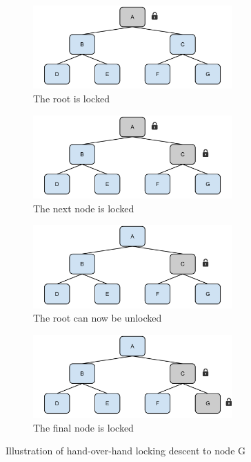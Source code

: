 \documentclass[11pt,a4paper]{globis-book}
\begin{document}
\begin{figure}[t]
    \centering
    \begin{subfigure}[b]{0.5\linewidth}
        \includegraphics[width = 3in]{images/Tree-HoH-a}
        \caption{The root is locked}
    \end{subfigure}%
    \begin{subfigure}[b]{0.5\linewidth}
        \includegraphics[width = 3in]{images/Tree-HoH-b}
        \caption{The next node is locked}
    \end{subfigure}
    \begin{subfigure}[b]{0.5\linewidth}
        \includegraphics[width = 3in]{images/Tree-HoH-c}
        \caption{The root can now be unlocked}
    \end{subfigure}%
    \begin{subfigure}[b]{0.5\linewidth}
        \includegraphics[width = 3in]{images/Tree-HoH-d}
        \caption{The final node is locked}
    \end{subfigure}
    \caption{Illustration of hand-over-hand locking descent to node G}
    \label{fig:locking-hoh}
\end{figure}
\end{document}

